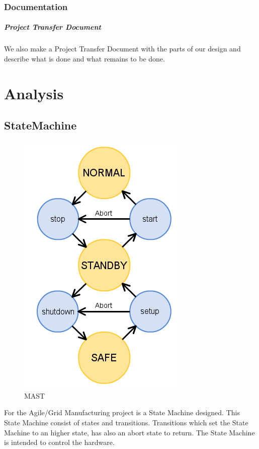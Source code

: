 \documentclass[12pt,a4paper]{report}
\begin{document}
\subsection{Documentation}
\paragraph{Project Transfer Document}We also make a Project Transfer Document with the parts of our design and describe what is done and what remains to be done.

\chapter{Analysis}
\section{StateMachine}
\begin{figure}
	\begin{center}
		\includegraphics[scale=0.5]{pictures/mast.png}
	\caption{MAST}
	\vspace{-100pt}
	\end{center}
\end{figure}
For the Agile/Grid Manufacturing project is a State Machine designed. This State Machine consist of states and transitions. Transitions which set the State Machine to an higher state, has also an abort state to return. The State Machine is intended to control the hardware.
\end{document}
